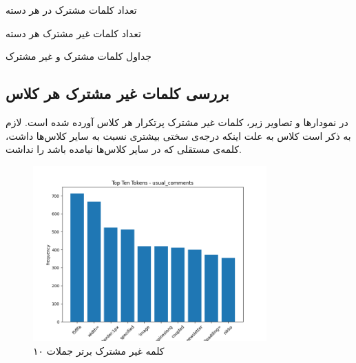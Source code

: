 \begin{table}
  \centering
  \begin{subtable}{0.4\textwidth}
    \centering
    \begin{latin}
    \end{latin}
    \caption{تعداد کلمات مشترک در هر دسته}
    \label{subfig:unique_common_words_total}
  \end{subtable}
  \hfill
  \begin{subtable}{0.4\textwidth}
    \centering
    \begin{latin}
    \end{latin}
    \caption{تعداد کلمات غیر مشترک هر دسته}
    \label{subfig:file2}
  \end{subtable}
  
  \caption{جداول کلمات مشترک و غیر مشترک}
  \label{fig:csv_files}
\end{table}

\subsection{بررسی کلمات غیر مشترک هر کلاس} 
\par
در نمودارها و تصاویر زیر، کلمات غیر مشترک پرتکرار هر کلاس آورده شده است.
لازم به ذکر است کلاس  به علت اینکه درجه‌ی سختی بیشتری نسبت به سایر کلاس‌ها داشت، کلمه‌ی مستقلی که در سایر کلاس‌ها نیامده باشد را نداشت.

\begin{figure}[htbp]
  \centering
  \includegraphics[width=0.8\textwidth]{stats/top_ten_tokens_usual_comments.png}
  \caption{۱۰ کلمه غیر مشترک برتر جملات }
  \label{fig:unique_common_words_total}
\end{figure}


